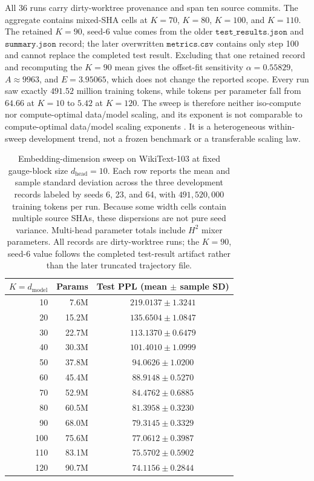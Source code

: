\documentclass[twoside,11pt]{article}
\begin{document}
All 36 runs carry dirty-worktree provenance and span ten source commits. The aggregate contains mixed-SHA cells at $K=70$, $K=80$, $K=100$, and $K=110$. The retained $K=90$, seed-6 value comes from the older $\texttt{test\_results.json}$ and $\texttt{summary.json}$ record; the later overwritten $\texttt{metrics.csv}$ contains only step 100 and cannot replace the completed test result. Excluding that one retained record and recomputing the $K=90$ mean gives the offset-fit sensitivity $\alpha=0.55829$, $A\approx9963$, and $E=3.95065$, which does not change the reported scope. Every run saw exactly $491.52$ million training tokens, while tokens per parameter fall from $64.66$ at $K=10$ to $5.42$ at $K=120$. The sweep is therefore neither iso-compute nor compute-optimal data/model scaling, and its exponent is not comparable to compute-optimal data/model scaling exponents \citep{HoffmannChinchilla2022}. It is a heterogeneous within-sweep development trend, not a frozen benchmark or a transferable scaling law.

\begin{table}[h]
\centering
\begin{tabular}{rrc}
\hline
$K = d_{\text{model}}$ & Params & Test PPL (mean $\pm$ sample SD) \\
\hline
10 & 7.6M & $219.0137 \pm 1.3241$ \\
20 & 15.2M & $135.6504 \pm 1.0847$ \\
30 & 22.7M & $113.1370 \pm 0.6479$ \\
40 & 30.3M & $101.4010 \pm 1.0999$ \\
50 & 37.8M & $94.0626 \pm 1.0200$ \\
60 & 45.4M & $88.9148 \pm 0.5270$ \\
70 & 52.9M & $84.4762 \pm 0.6885$ \\
80 & 60.5M & $81.3958 \pm 0.3230$ \\
90 & 68.0M & $79.3145 \pm 0.3329$ \\
100 & 75.6M & $77.0612 \pm 0.3987$ \\
110 & 83.1M & $75.5702 \pm 0.5902$ \\
120 & 90.7M & $74.1156 \pm 0.2844$ \\
\hline
\end{tabular}
\caption{Embedding-dimension sweep on WikiText-103 at fixed gauge-block size $d_{\text{head}}=10$. Each row reports the mean and sample standard deviation across the three development records labeled by seeds 6, 23, and 64, with $491{,}520{,}000$ training tokens per run. Because some width cells contain multiple source SHAs, these dispersions are not pure seed variance. Multi-head parameter totals include $H^2$ mixer parameters. All records are dirty-worktree runs; the $K=90$, seed-6 value follows the completed test-result artifact rather than the later truncated trajectory file.}
\label{tab:vfe3_scaling}
\end{table}
\end{document}
